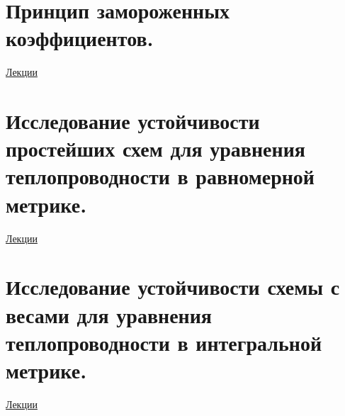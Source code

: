 \documentclass[specialist, subf, href, colorlinks=true, 12pt, times, mtpro, final]{disser}
\theoremstyle{definition}
\begin{document}
\section {Принцип замороженных коэффициентов.}
	\hyperlink {lects.132}{Лекции}\\

\section {Исследование устойчивости простейших схем для уравнения теплопроводности в равномерной метрике.}
	\hyperlink {lects.134}{Лекции}\\

\section {Исследование устойчивости схемы с весами для уравнения теплопроводности в интегральной метрике.}
	\hyperlink {lects.136}{Лекции}\\





\end{document}
